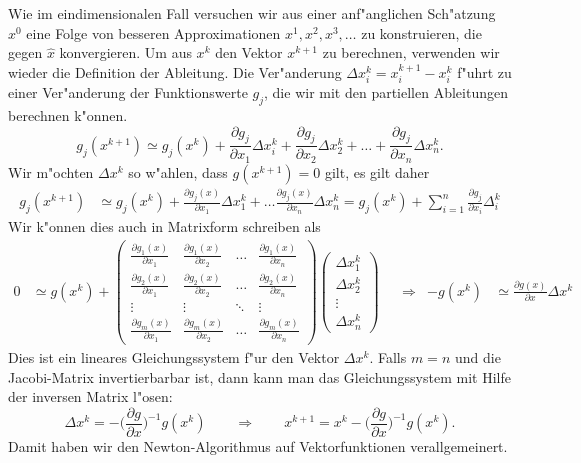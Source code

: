 Wie im eindimensionalen Fall versuchen wir aus einer anf"anglichen
Sch"atzung $x^{0}$ eine Folge von besseren Approximationen $x^1,
x^2,x^3,\dots$ zu konstruieren, die gegen $\hat{x}$ konvergieren.
Um aus $x^k$ den Vektor $x^{k+1}$ zu berechnen, verwenden wir wieder
die Definition der Ableitung.
Die Ver"anderung $\Delta x_i^k=x_i^{k+1}-x_i^k$ f"uhrt zu einer Ver"anderung
der Funktionswerte $g_j$, die wir mit den partiellen Ableitungen berechnen
k"onnen. 
\[
g_j(x^{k+1})
\simeq
g_j(x^k)
+ \frac{\partial g_j}{\partial x_1}\Delta x_i^k
+ \frac{\partial g_j}{\partial x_2}\Delta x_2^k
+ \dots 
+ \frac{\partial g_j}{\partial x_n}\Delta x_n^k.
\]
Wir m"ochten $\Delta x^k$ so w"ahlen, dass $g(x^{k+1})=0$ gilt,
es gilt daher
\begin{align*}
g_j(x^{k+1})
&\simeq
	g_j(x^k) + \frac{\partial g_j(x)}{\partial x_1}\Delta x_1^k + \dots
		\frac{\partial g_j(x)}{\partial x_n}\Delta x_n^k
	=g_j(x^k)+\sum_{i=1}^n\frac{\partial g_j}{\partial x_i}\Delta_i^k
\end{align*}
Wir k"onnen dies auch in Matrixform schreiben als
\begin{align*}
0&\simeq g(x^k) +\begin{pmatrix}
\displaystyle\frac{\partial g_1(x)}{\partial x_1}
	&\displaystyle\frac{\partial g_1(x)}{\partial x_2}
		&\dots
			&\displaystyle\frac{\partial g_1(x)}{\partial x_n}\\
\displaystyle\frac{\partial g_2(x)}{\partial x_1}
	&\displaystyle\frac{\partial g_2(x)}{\partial x_2}
		&\dots
			&\displaystyle\frac{\partial g_2(x)}{\partial x_n}\\
\vdots
	&\vdots
		&\ddots
			&\vdots\\
\displaystyle\frac{\partial g_m(x)}{\partial x_1}
	&\displaystyle\frac{\partial g_m(x)}{\partial x_2}
		&\dots
			&\displaystyle\frac{\partial g_m(x)}{\partial x_n}
\end{pmatrix}
\begin{pmatrix}
\Delta x_1^k\\
\Delta x_2^k\\
\vdots\\
\Delta x_n^k
\end{pmatrix}
&&\Rightarrow&
-g(x^k)
&\simeq
\frac{\partial g(x)}{\partial x}\Delta x^k
\end{align*}
Dies ist ein lineares Gleichungssystem f"ur den Vektor $\Delta x^k$.
Falls $m=n$ und die Jacobi-Matrix invertierbarbar ist, dann kann
man das Gleichungssystem mit Hilfe der inversen Matrix l"osen:
\[
\Delta x^k =
-\biggl(\frac{\partial g}{\partial x}\biggr)^{-1} g(x^k)
\qquad
\Rightarrow
\qquad
x^{k+1}=x^k  -\biggl(\frac{\partial g}{\partial x}\biggr)^{-1} g(x^k).
\]
Damit haben wir den Newton-Algorithmus auf Vektorfunktionen verallgemeinert.

